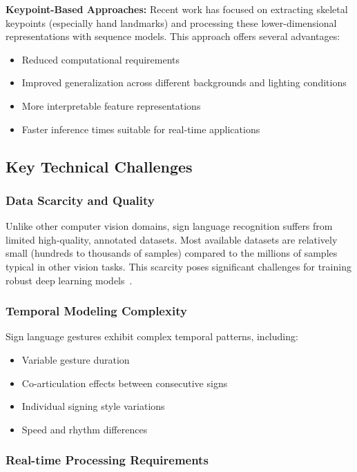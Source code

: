 \documentclass[11pt, a4paper]{article}
\begin{document}
\textbf{Keypoint-Based Approaches:}
Recent work has focused on extracting skeletal keypoints (especially hand landmarks) and processing these lower-dimensional representations with sequence models. This approach offers several advantages:
\begin{itemize}
    \item Reduced computational requirements
    \item Improved generalization across different backgrounds and lighting conditions
    \item More interpretable feature representations
    \item Faster inference times suitable for real-time applications~\cite{Adaloglou21}
\end{itemize}

\subsection{Key Technical Challenges}

\subsubsection{Data Scarcity and Quality}

Unlike other computer vision domains, sign language recognition suffers from limited high-quality, annotated datasets. Most available datasets are relatively small (hundreds to thousands of samples) compared to the millions of samples typical in other vision tasks. This scarcity poses significant challenges for training robust deep learning models~\cite{Bragg19}.

\subsubsection{Temporal Modeling Complexity}

Sign language gestures exhibit complex temporal patterns, including:
\begin{itemize}
    \item Variable gesture duration
    \item Co-articulation effects between consecutive signs
    \item Individual signing style variations
    \item Speed and rhythm differences~\cite{Camgoz20}
\end{itemize}

\subsubsection{Real-time Processing Requirements}
\end{document}
